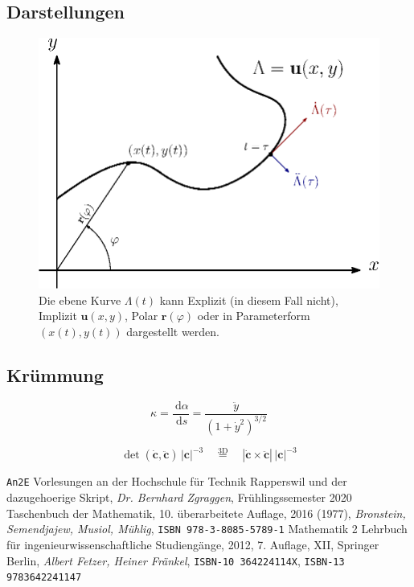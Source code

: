 \documentclass[a4paper]{article}
\numberwithin{equation}{subsection}
\newcommand{\dd}[1]{\ensuremath{~\mathrm{d}#1}}
\newcommand{\deriv}[2]{\ensuremath{\frac{\dd{#1}}{\dd{#2}}}}
\renewcommand{\vec}[1]{\ensuremath{\bm{#1}}}
\begin{document}
\begin{multicols}{2}
\subsection{Darstellungen}
\begin{figure}[H]
\centering
\includegraphics[width=.9\linewidth]{fig/plane-curve.eps}
\caption{Die ebene Kurve \(\Lambda(t)\) kann Explizit (in diesem Fall nicht), Implizit \(\vec{u}(x,y)\), Polar \(\vec{r}(\varphi)\) oder in Parameterform \((x(t), y(t))\) dargestellt werden.}
\end{figure}

\subsection{Kr\"ummung}
\[
	\kappa = \deriv{\alpha}{s} = \frac{\ddot{y}}{(1+\dot{y}^2)^{3/2}}
\]

\[
	\det(\vec{\dot{c}}, \vec{\ddot{c}})\,|\vec{c}|^{-3}
	\quad \stackrel{\text{3D}}{=} \quad
	|\vec{\dot{c}}\times\vec{\ddot{c}}|\,|\vec{c}|^{-3}
\]

\begin{thebibliography}{1}
    \texttt{An2E} Vorlesungen an der Hochschule f\"ur Technik Rapperswil und der dazugehoerige Skript,
    \textit{Dr. Bernhard Zgraggen}, Fr\"uhlingssemester 2020
    Taschenbuch der Mathematik,
    10. \"uberarbeitete Auflage, 2016 (1977),
    \textit{Bronstein, Semendjajew, Musiol, M\"uhlig}, 
    \texttt{ISBN 978-3-8085-5789-1}
    Mathematik 2 Lehrbuch für ingenieurwissenschaftliche Studieng\"ange,
    2012, 7. Auflage, XII, Springer Berlin,
    \textit{Albert Fetzer, Heiner Fränkel},
    \texttt{ISBN-10 364224114X},
    \texttt{ISBN-13 9783642241147}
    

\end{thebibliography}
\end{multicols}
\end{document}
